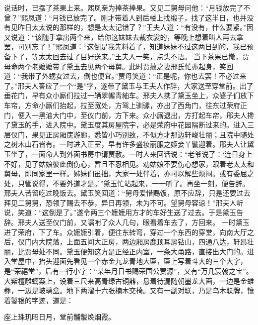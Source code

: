 \documentclass[12pt,oneside]{book}
\begin{document}
说话时，已摆了茶果上来。熙凤亲为捧茶捧果。又见二舅母问他：“月钱放完了不曾？”熙凤道：“月钱已放完了。刚才带着人到后楼上找缎子，找了这半日，也并没有见昨日太太说的那样的，想是太太记错了？”王夫人道：“有没有，什么要紧。”因又说道：“该随手拿出两个来，给你这妹妹去裁衣裳的，等晚上想着叫人再去拿罢，可别忘了！”熙凤道：“这倒是我先料着了，知道妹妹不过这两日到的，我已预备下了，等太太回去过了目好送来。”王夫人一笑，点头不语。
当下茶果已撤，贾母命两个老嬷嬷带了黛玉去见两个母舅。此时贾赦之妻邢氏忙亦起身，笑回道：“我带了外甥女过去，倒也便宜。”贾母笑道：“正是呢，你也去罢！不必过来了。”邢夫人答应了一个“是”字，遂带了黛玉与王夫人作辞，大家送至穿堂前。出了垂花门，早有众小厮们拉过一辆翠幄青紬车。邢夫人携了黛玉坐上，众婆子们放下车帘，方命小厮们抬起，拉至宽处，方驾上驯骡，亦出了西角门，往东过荣府正门，便入一黑油大门中，至仪门前，方下来。众小厮退出，方打起车帘，邢夫人搀了黛玉的手，进入院中。黛玉度其房屋院宇，必是荣府中花园隔断过来的。进入三层仪门，果见正房厢庑游廊，悉皆小巧别致，不似方才那边轩峻壮丽；且院中随处之树木山石皆有。一时进入正室，早有许多盛妆丽服之姬妾丫鬟迎着。邢夫人让黛玉坐了，一面命人到外面书房中请贾赦。一时人来回话说：“老爷说了：‘连日身上不好，见了姑娘彼此倒伤心，暂且不忍相见。劝姑娘不要伤心想家，跟着老太太和舅母，即同家里一样。姊妹们虽拙，大家一处伴着，亦可以解些烦闷。或有委屈之处，只管说得，不要外道才是。’”黛玉忙站起来，一一听了。再坐一刻，便告辞。邢夫人苦留吃过晚饭去。黛玉笑回道：“舅母爱惜赐饭，原不应辞，只是还要过去拜见二舅舅，恐领了赐去不恭，异日再领，未为不可。望舅母容谅！”邢夫人听说，笑道：“这倒是了。”遂令两三个嬷嬷用方才的车好生送了过去。于是黛玉告辞。邢夫人送至仪门前，又嘱咐了众人几句，眼看着车去了，方回来。
一时黛玉进了荣府，下了车。众嬷嬷引着，便往东转弯，穿过一个东西的穿堂，向南大厅之后，仪门内大院落，上面五间大正房，两边厢房鹿顶耳房钻山，四通八达，轩昂壮丽，比贾母处不同。黛玉便知这方是正经正内室，一条大甬路，直接出大门的。进入堂屋中，抬头迎面先看见一个赤金九龙青地大匾，匾上写着斗大的三个大字，是“荣禧堂”，后有一行小字：“某年月日书赐荣国公贾源”，又有“万几宸翰之宝”。大紫檀雕螭案上，设着三尺来高青绿古铜鼎，悬着待漏随朝墨龙大画，一边是金蜼彝，一边是玻璃盒。地下两溜十六张楠木交椅。又有一副对联，乃是乌木联牌，镶着錾银的字迹，道是：

座上珠玑昭日月，堂前黼黻焕烟霞。
\end{document}
